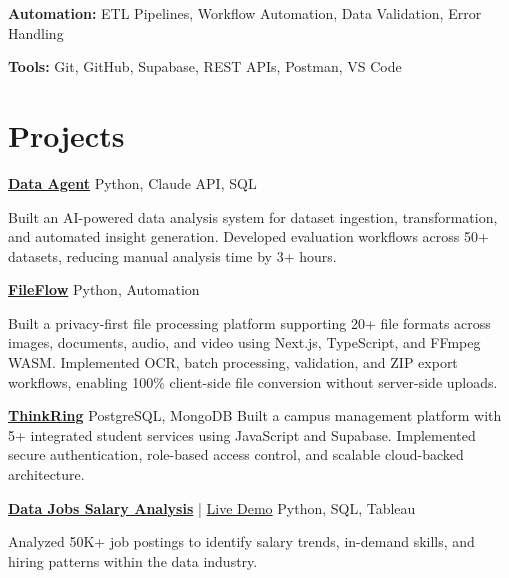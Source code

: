 \documentclass[11pt,a4paper]{article}
\begin{document}
\textbf{Automation:}
ETL Pipelines, Workflow Automation, Data Validation, Error Handling

\textbf{Tools:}
Git, GitHub, Supabase, REST APIs, Postman, VS Code


\section*{Projects}

\textbf{\href{https://github.com/akhilbehara999/data-agent}{Data Agent}}
\hfill Python, Claude API, SQL

Built an AI-powered data analysis system for dataset ingestion, transformation, and automated insight generation. Developed evaluation workflows across 50+ datasets, reducing manual analysis time by 3+ hours.

\vspace{3pt}

\textbf{\href{https://github.com/akhilbehara999/FileFlow}{FileFlow}}
\hfill Python, Automation

Built a privacy-first file processing platform supporting 20+ file formats across images, documents, audio, and video using Next.js, TypeScript, and FFmpeg WASM.
Implemented OCR, batch processing, validation, and ZIP export workflows, enabling 100\% client-side file conversion without server-side uploads.

\vspace{3pt}

\textbf{\href{https://github.com/akhilbehara999/thinkring-project-with-supabase}{ThinkRing}}
\hfill PostgreSQL, MongoDB
Built a campus management platform with 5+ integrated student services using JavaScript and Supabase.
Implemented secure authentication, role-based access control, and scalable cloud-backed architecture.

\vspace{3pt}

\textbf{\href{https://github.com/akhilbehara999/data-jobs-salary-analysis}{Data Jobs Salary Analysis}} |
\href{https://data-jobs-salary-analysis-zrjymrqkcvgo53tpxwq9uh.streamlit.app/}{ Live Demo}
\hfill Python, SQL, Tableau

Analyzed 50K+ job postings to identify salary trends, in-demand skills, and hiring patterns within the data industry.

\end{document}
